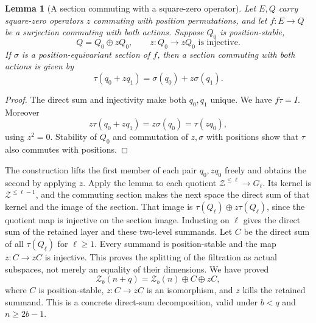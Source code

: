 \documentclass[11pt,a4paper,oneside,openany]{book}
\newtheorem{lemma}[theorem]{Lemma}
\theoremstyle{definition}\newtheorem{definition}[theorem]{Definition}
\theoremstyle{remark}\newtheorem{remark}[theorem]{Remark}
\numberwithin{equation}{chapter}
\begin{document}
\begin{lemma}[A section commuting with a square-zero operator]\label{tx:lem:commuting-section}
Let $E,Q$ carry square-zero operators $z$ commuting with position permutations, and let $f:E\to Q$ be a surjection commuting with both actions. Suppose $Q_0$ is position-stable,
\[
                Q=Q_0\oplus zQ_0,
                \qquad z:Q_0\longrightarrow zQ_0\text{ is injective}.
\]
If $\sigma$ is a position-equivariant section of $f$, then a section commuting with both actions is given by
\[\tau(q_0+zq_1)=\sigma(q_0)+z\sigma(q_1).
\]
\end{lemma}
\begin{proof}
The direct sum and injectivity make both $q_0,q_1$ unique. We have $f\tau=I$. Moreover
\[z\tau(q_0+zq_1)=z\sigma(q_0)=\tau(zq_0),
\]
using $z^2=0$. Stability of $Q_0$ and commutation of $z,\sigma$ with positions show that $\tau$ also commutes with positions.
\end{proof}
The construction lifts the first member of each pair $q_0,zq_0$ freely and obtains the second by applying $z$. Apply the lemma to each quotient
$\mathcal Z^{\le \ell}\to G_\ell$. Its kernel is
$\mathcal Z^{\le \ell-1}$, and the commuting section makes the next
space the direct sum of that kernel and the image of the section.
That image is $\tau(Q_\ell)\oplus z\tau(Q_\ell)$, since the quotient map
is injective on the section image. Inducting on $\ell$ gives the direct
sum of the retained layer and these two-level summands. Let $C$ be
the direct sum of all $\tau(Q_\ell)$ for $\ell\ge1$. Every summand is
position-stable and the map $z:C\to zC$ is injective. This proves
the splitting of the filtration as actual subspaces, not merely
an equality of their dimensions. We have proved
\begin{equation}\label{tx:eq:socsplit2}
\mathcal Z_b(n+q)=\mathcal Z_b(n)\oplus C\oplus zC,
\end{equation}
where $C$ is position-stable, $z:C\to zC$ is an isomorphism, and $z$ kills the retained summand. This is a concrete direct-sum decomposition, valid under $b<q$ and $n\ge2b-1$.
\end{document}
